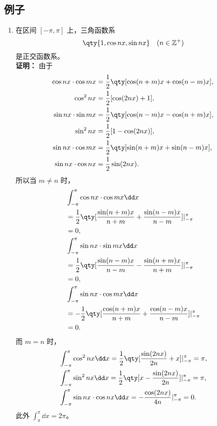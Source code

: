 \subsection{例子}
\begin{enumerate}
\item 在区间 $[-\pi,\pi]$ 上，三角函数系
\begin{equation}
\qty{1,\cos nx,\sin nx}\quad(n\in \mathbb{Z^{+}})~
\end{equation}
是正交函数系。\\

\textbf{证明：}
由于
\begin{equation}
\begin{aligned}
\cos nx\cdot\cos mx&=\frac{1}{2}\qty[\cos(n+m)x+\cos(n-m)x],\\
\cos^2 nx&=\frac{1}{2}[\cos(2nx)+1],\\
\sin nx\cdot\sin mx&=\frac{1}{2}\qty[\cos(n-m)x-\cos(n+m)x],\\
\sin^2 nx&=\frac{1}{2}[1-\cos(2nx)],\\
\sin nx\cdot\cos mx&=\frac{1}{2}\qty[\sin(n+m)x+\sin(n-m)x],\\
\sin nx\cdot\cos nx&=\frac{1}{2}\sin(2nx).
\end{aligned}~
\end{equation}
所以当 $m\neq n$ 时，
\begin{equation}
\begin{aligned}
&\int_{-\pi}^\pi\cos nx \cdot \cos mx\dd x\\
&=\frac{1}{2}\qty[\frac{\sin(n+m)x}{n+m}+\frac{\sin(n-m)x}{n-m}]{\huge |}_{-\pi}^{\pi}\\
&=0,\\
&\int_{-\pi}^\pi\sin nx \cdot \sin mx\dd x\\
&=\frac{1}{2}\qty[\frac{\sin(n-m)x}{n-m}-\frac{\sin(n+m)x}{n+m}]{\huge |}_{-\pi}^{\pi}\\
&=0,\\
&\int_{-\pi}^\pi\sin nx \cdot \cos mx\dd x\\
&=-\frac{1}{2}\qty[\frac{\cos(n+m)x}{n+m}+\frac{\cos(n-m)x}{n-m}]{\huge |}_{-\pi}^{\pi}\\
&=0.\\
\end{aligned}
~
\end{equation}
而 $m=n$ 时，
\begin{equation}
\begin{aligned}
&\int_{-\pi}^\pi\cos^2 nx\dd x=\frac{1}{2}\qty[\frac{\sin(2nx)}{2n}+x]{\huge |}_{-\pi}^{\pi}=\pi,\\
&\int_{-\pi}^\pi\sin^2 nx\dd x=\frac{1}{2}\qty[x-\frac{\sin(2nx)}{2n}]{\huge |}_{-\pi}^{\pi}=\pi,\\
&\int_{-\pi}^\pi\sin nx \cdot \cos nx\dd x=-\frac{\cos(2nx)}{4n}{\huge |}_{-\pi}^{\pi}=0.
\end{aligned}
~
\end{equation}
此外 $\int_{\pi}^{\pi}\dd x=2\pi$。\\


\end{enumerate}
